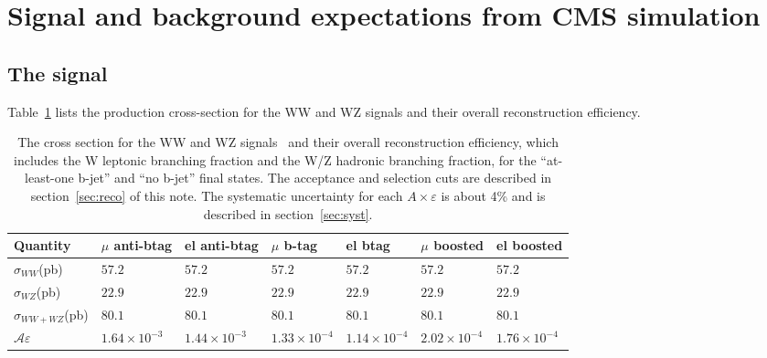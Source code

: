 \clearpage{}
\section{Signal and background expectations from CMS simulation}
\label{sec:MCexpectations}
\subsection {The signal}
Table~\ref{tab:signals} lists the production cross-section for the WW and 
WZ signals and their overall reconstruction efficiency.
\begin{table}[bthp]
\begin{center}

{\footnotesize
\begin{tabular}{l|llllll}
\hline
\hline
        Quantity                        & $\mu$ anti-btag & el anti-btag & $\mu$ b-tag & el btag & $\mu$ boosted & el boosted \\
\hline	
$\sigma_{WW}$(\unit{pb})         & $57.2$           & $57.2$        & $57.2$        &   $57.2$       & $57.2$        & $57.2$       \\
$\sigma_{WZ}$(\unit{pb})         & $22.9$           & $22.9$        & $22.9$        &   $22.9$       & $22.9$        & $22.9$       \\
$\sigma_{WW+WZ}$(\unit{pb})      & $80.1$           & $80.1$        & $80.1$        &   $80.1$       & $80.1$        & $80.1$       \\
	$\mathcal{A}\varepsilon$        & $1.64\times 10^{-3}$           & $1.44\times 10^{-3}$         & $1.33\times 10^{-4}$         & $1.14\times 10^{-4}$         & $2.02\times 10^{-4}$        & $1.76\times 10^{-4}$       \\
\hline
\hline
\end{tabular}
}

\end{center}
\caption{\label{tab:signals}
The cross section for the WW and WZ signals~\cite{Campbell:2011bn} and their overall reconstruction efficiency, which includes
the W leptonic branching fraction and the W/Z hadronic branching fraction, for the ``at-least-one b-jet'' and ``no b-jet'' final states. The 
acceptance and selection cuts are described in section~\ref{sec:reco} of this note. The systematic uncertainty 
for each $A\times\varepsilon$ is about 4\% and is described in section~\ref{sec:syst}.}
\end{table}
